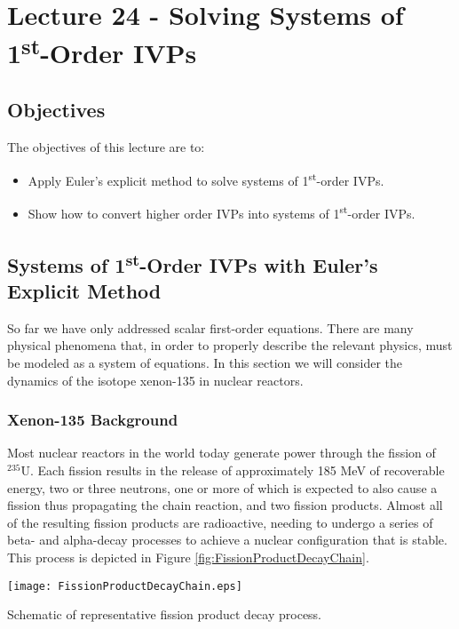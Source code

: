 \chapter{Lecture 24 - Solving Systems of 1\textsuperscript{st}-Order IVPs}
\label{ch:lec24n}
\section{Objectives}
The objectives of this lecture are to:
\begin{itemize}
\item Apply Euler's explicit method to solve systems of 1\textsuperscript{st}-order IVPs.
\item Show how to convert higher order IVPs into systems of 1\textsuperscript{st}-order IVPs.
\end{itemize}
\setcounter{lstannotation}{0}

\section{Systems of 1\textsuperscript{st}-Order IVPs with Euler's Explicit Method}
So far we have only addressed scalar first-order equations.  There are many physical phenomena that, in order to properly describe the relevant physics, must be modeled as a system of equations.  In this section we will consider the dynamics of the isotope xenon-135 in nuclear reactors.

\subsection{Xenon-135 Background}

Most nuclear reactors in the world today generate power through the fission of $^{235}\text{U}$.  Each fission results in the release of approximately 185 MeV of recoverable energy, two or three neutrons, one or more of which is expected to also cause a fission thus propagating the chain reaction, and two fission products.  Almost all of the resulting fission products are radioactive, needing to undergo a series of beta- and alpha-decay processes to achieve a nuclear configuration that is stable.  This process is depicted in Figure \ref{fig:FissionProductDecayChain}.
\begin{marginfigure}
\texttt{[image: FissionProductDecayChain.eps]}
\caption{Schematic of representative fission product decay process.}
\label{fig:FissionProductDecayChain}
\end{marginfigure}


